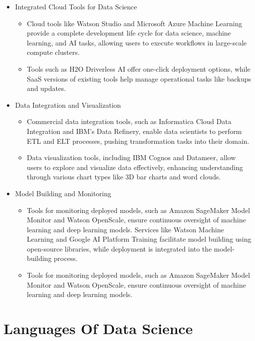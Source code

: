 \documentclass[12pt]{report} %
\begin{document}
	\begin{itemize}
		\item Integrated Cloud Tools for Data Science
		\begin{itemize}
			\item  Cloud tools like Watson Studio and Microsoft Azure Machine Learning provide a complete development life cycle for data science, machine learning, and AI tasks, allowing users to execute workflows in large-scale compute clusters.
			\item Tools such as H2O Driverless AI offer one-click deployment options, while SaaS versions of existing tools help manage operational tasks like backups and updates.
		\end{itemize}
		\item Data Integration and Visualization
		\begin{itemize}
			\item Commercial data integration tools, such as Informatica Cloud Data Integration and IBM’s Data Refinery, enable data scientists to perform ETL and ELT processes, pushing transformation tasks into their domain.
			\item Data visualization tools, including IBM Cognos and Datameer, allow users to explore and visualize data effectively, enhancing understanding through various chart types like 3D bar charts and word clouds.
		\end{itemize}
		\item Model Building and Monitoring
		\begin{itemize}
			\item Tools for monitoring deployed models, such as Amazon SageMaker Model Monitor and Watson OpenScale, ensure continuous oversight of machine learning and deep learning models. Services like Watson Machine Learning and Google AI Platform Training facilitate model building using open-source libraries, while deployment is integrated into the model-building process.
			\item Tools for monitoring deployed models, such as Amazon SageMaker Model Monitor and Watson OpenScale, ensure continuous oversight of machine learning and deep learning models.
		\end{itemize}			
	\end{itemize}
	
	
	\section{Languages Of Data Science}
	
\end{document}
